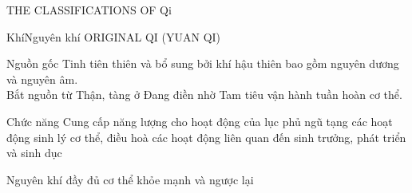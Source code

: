 \documentclass[
	11pt, %
]{beamer}
\theoremstyle{newblock}
\begin{document}
\begin{frame}
	\Huge{THE CLASSIFICATIONS OF Qi}\\
\end{frame}
\begin{frame}{Khí}{Nguyên khí ORIGINAL QI (YUAN QI)}
	\begin{block}{Nguồn gốc}
		Tinh tiên thiên và bổ sung bởi khí hậu thiên bao gồm nguyên dương và nguyên âm.\\
		Bắt nguồn từ Thận, tàng ở Đang điền nhờ Tam tiêu vận hành tuần hoàn cơ thể.
	\end{block}
	\begin{block}{Chức năng}
		Cung cấp năng lượng cho hoạt động của lục phủ ngũ tạng các hoạt động sinh lý cơ thể, điều hoà các hoạt động liên quan đến sinh trưởng, phát triển và sinh dục 
	\end{block}
	Nguyên khí đầy đủ cơ thể khỏe mạnh và ngược lại
\end{frame}
\end{document}
